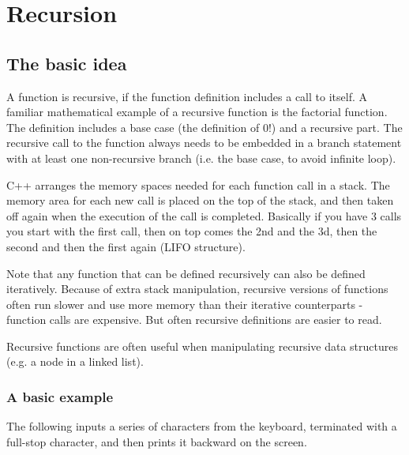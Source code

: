 \section{Recursion}

\subsection{The basic idea}
A function is recursive, if the function definition includes a call to itself. A familiar mathematical example
of a recursive function is the factorial function. The definition includes a base case (the definition of 0!) and a
recursive part. The recursive call to the function always needs to be embedded in a branch statement
with at least one non-recursive branch (i.e. the base case, to avoid infinite loop). 

C++ arranges the memory
spaces needed for each function call in a stack. The memory area for each new call is placed on the top of the stack,
and then taken off again when the execution of the call is completed. Basically if you have 3 calls you start with the
first call, then on top comes the 2nd and the 3d, then the second and then the first again (LIFO structure).

Note that any function that can be defined recursively can also be defined iteratively. Because of extra stack
manipulation, recursive versions of functions often run slower and use more memory than their iterative
counterparts - function calls are expensive. But often recursive definitions are easier to read.

Recursive functions are often useful when manipulating recursive data structures (e.g. a node in a linked list).

\subsubsection*{A basic example}
The following inputs a series of characters from the keyboard, terminated with a full-stop character, and then
prints it backward on the screen.



